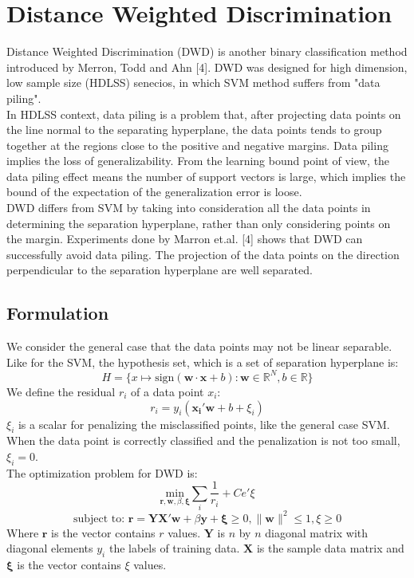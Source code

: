 \documentclass[12pt]{article}
\theoremstyle{definition}
\theoremstyle{remark}
\numberwithin{equation}{section}
\begin{document}
\section{Distance Weighted Discrimination}
Distance Weighted Discrimination (DWD) is another binary classification method introduced by Merron, Todd and Ahn [4]. DWD was designed for high dimension, low sample size (HDLSS) senecios, in which SVM method suffers from "data piling". \\[0.2cm]
In HDLSS context, data piling is a problem that, after projecting data points on the line normal to the separating hyperplane, the data points tends to group together at the regions close to the positive and negative margins. Data piling implies the loss of generalizability. From the learning bound point of view, the data piling effect means the number of support vectors is large, which implies the bound of the expectation of the generalization error is loose. \\[0.2cm]
DWD differs from SVM by taking into consideration all the data points in determining the separation hyperplane, rather than only considering points on the margin. Experiments done by Marron et.al. [4] shows that DWD can successfully avoid data piling. The projection of the data points on the direction perpendicular to the separation hyperplane are well separated.
\subsection{Formulation}
We consider the general case that the data points may not be linear separable. Like for the SVM, the hypothesis set, which is a set of separation hyperplane is:
\[H = \{x\mapsto \mathrm{sign}(\mathbf{w\cdot x}+b): \mathbf{w} \in \mathbb{R}^N, b \in \mathbb{R} \}\]
We define the residual $r_i$ of a data point $x_i$:
\[r_i = y_i(\mathbf{x_i'w}+b+\xi_i)\]
$\xi_i$ is a scalar for penalizing the misclassified points, like the general case SVM. When the data point is correctly classified and the penalization is not too small, $\xi_i = 0$. \\[0.2cm]
The optimization problem for DWD is:
\[\underset{\mathbf{r,w,}\beta,\mathbf{\xi}}{\mathrm{min}}\sum_i \frac{1}{r_i} + Ce'\xi\]
\[\text{subject to: }\mathbf{r} = \mathbf{YX'w} + \beta\mathbf{y} + \boldsymbol{\xi} \geq 0, \|\mathbf{w}\|^2 \leq 1, \xi \geq 0\]
Where $\mathbf{r}$ is the vector contains $r$ values. $\mathbf{Y}$ is $n$ by $n$ diagonal matrix with diagonal elements $y_i$ the labels of training data. $\mathbf{X}$ is the sample data matrix and $\boldsymbol{\xi}$ is the vector contains $\xi$ values.
\end{document}
